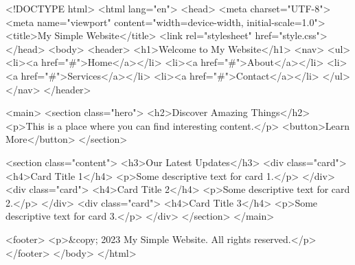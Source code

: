 <!DOCTYPE html>
<html lang="en">
<head>
    <meta charset="UTF-8">
    <meta name="viewport" content="width=device-width, initial-scale=1.0">
    <title>My Simple Website</title>
    <link rel="stylesheet" href="style.css">
</head>
<body>
    <header>
        <h1>Welcome to My Website</h1>
        <nav>
            <ul>
                <li><a href="#">Home</a></li>
                <li><a href="#">About</a></li>
                <li><a href="#">Services</a></li>
                <li><a href="#">Contact</a></li>
            </ul>
        </nav>
    </header>

    <main>
        <section class="hero">
            <h2>Discover Amazing Things</h2>
            <p>This is a place where you can find interesting content.</p>
            <button>Learn More</button>
        </section>

        <section class="content">
            <h3>Our Latest Updates</h3>
            <div class="card">
                <h4>Card Title 1</h4>
                <p>Some descriptive text for card 1.</p>
            </div>
            <div class="card">
                <h4>Card Title 2</h4>
                <p>Some descriptive text for card 2.</p>
            </div>
            <div class="card">
                <h4>Card Title 3</h4>
                <p>Some descriptive text for card 3.</p>
            </div>
        </section>
    </main>

    <footer>
        <p>&copy; 2023 My Simple Website. All rights reserved.</p>
    </footer>
</body>
</html>